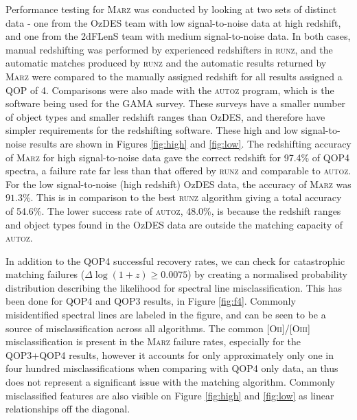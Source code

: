 \documentclass[5p]{elsarticle}
\newcommand{\runz}{\textsc{runz}}
\newcommand{\autoz}{\textsc{autoz}}
\newcommand{\marz}{\textsc{Marz}}
\begin{document}
Performance testing for \marz{} was conducted by looking at two sets of distinct data - one from the OzDES team with low signal-to-noise data at high redshift, and one from the 2dFLenS team with medium signal-to-noise data. In both cases, manual redshifting was performed by experienced redshifters in \runz{}, and the automatic matches produced by \runz{} and the automatic results returned by \marz{} were compared to the manually assigned redshift for all results assigned a QOP of 4. Comparisons were also made with the \autoz{} program, which is the software being used for the GAMA survey. These surveys have a smaller number of object types and smaller redshift ranges than OzDES, and therefore have simpler requirements for the redshifting software. These high and low signal-to-noise results are shown in Figures \ref{fig:high} and \ref{fig:low}. The redshifting accuracy of \marz{} for high signal-to-noise data gave the correct redshift for 97.4\% of QOP4 spectra, a failure rate far less than that offered by \runz{} and comparable to \autoz{}. For the low signal-to-noise (high redshift) OzDES data, the accuracy of \marz{} was $91.3$\%. This is in comparison to the best \runz{} algorithm giving a total accuracy of 54.6\%. The lower success rate of \autoz, 48.0\%, is because the redshift ranges and object types found in the OzDES data are outside the matching capacity of \autoz{}.

In addition to the QOP4 successful recovery rates, we can check for catastrophic matching failures ($\Delta \log(1+z) \geq 0.0075$) by creating a normalised probability distribution describing the likelihood for spectral line misclassification. This has been done for QOP4 and QOP3 results, in Figure \ref{fig:f4}. Commonly misidentified spectral lines are labeled in the figure, and can be seen to be a source of misclassification across all algorithms. The common [O\textsc{ii}]/[O\textsc{iii}] misclassification is present in the \marz{} failure rates, especially for the QOP3+QOP4 results, however it accounts for only approximately only one in four hundred misclassifications when comparing with QOP4 only data, an thus does not represent a significant issue with the matching algorithm. Commonly misclassified features are also visible on Figure \ref{fig:high} and \ref{fig:low} as linear relationships off the diagonal.
\end{document}
